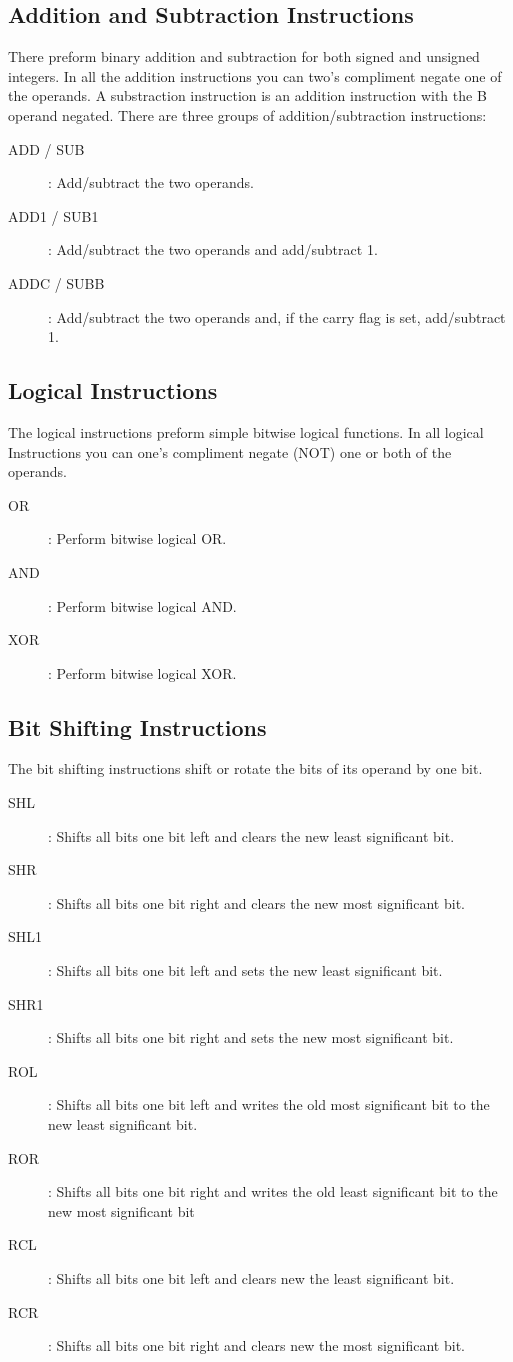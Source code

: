 \documentclass[oneside, a4paper]{memoir}
\begin{document}
\subsection{Addition and Subtraction Instructions}
There preform binary addition and subtraction for both signed and unsigned integers. In all the addition instructions you can two's compliment negate one of the operands. A substraction instruction is an addition instruction with the B operand negated. There are three groups of addition/subtraction instructions:
\begin{description}
\item[ADD / SUB]: Add/subtract the two operands.
\item[ADD1 / SUB1]: Add/subtract the two operands and add/subtract 1.
\item[ADDC / SUBB]: Add/subtract the two operands and, if the carry flag is set, add/subtract 1.
\end{description}
\subsection{Logical Instructions}
The logical instructions preform simple bitwise logical functions. In all logical Instructions you can one's compliment negate (NOT) one or both of the operands.
\begin{description}
\item[OR]: Perform bitwise logical OR.
\item[AND]: Perform bitwise logical AND.
\item[XOR]: Perform bitwise logical XOR.
\end{description}
\subsection{Bit Shifting Instructions}
The bit shifting instructions shift or rotate the bits of its operand by one bit.
\begin{description}
\item[SHL]: Shifts all bits one bit left and clears the new least significant bit.
\item[SHR]: Shifts all bits one bit right and clears the new most significant bit.
\item[SHL1]: Shifts all bits one bit left and sets the new least significant bit.
\item[SHR1]: Shifts all bits one bit right and sets the new most significant bit.
\item[ROL]: Shifts all bits one bit left and writes the old most significant bit to the new least significant bit.
\item[ROR]: Shifts all bits one bit right and writes the old least significant bit to the new most significant bit
\item[RCL]: Shifts all bits one bit left and clears new the least significant bit.
\item[RCR]: Shifts all bits one bit right and clears new the most significant bit.
\end{description}
\end{document}
